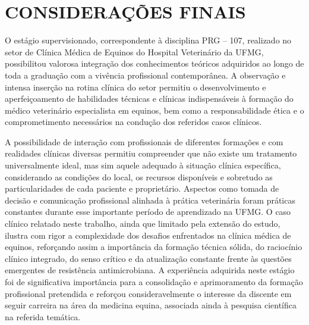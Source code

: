 \chapter{CONSIDERAÇÕES FINAIS}
\label{cap:conclusao}

O estágio supervisionado, correspondente à disciplina PRG -- 107,
realizado no setor de Clínica Médica de Equinos do Hospital Veterinário
da UFMG, possibilitou valorosa integração dos conhecimentos teóricos
adquiridos ao longo de toda a graduação com a vivência profissional
contemporânea. A observação e intensa inserção na rotina clínica do
setor permitiu o desenvolvimento e aperfeiçoamento de habilidades
técnicas e clínicas indispensáveis à formação do médico veterinário
especialista em equinos, bem como a responsabilidade ética e o
comprometimento necessários na condução dos referidos casos clínicos.

A possibilidade de interação com profissionais de diferentes formações e
com realidades clínicas diversas permitiu compreender que não existe um
tratamento universalmente ideal, mas sim aquele adequado à situação
clínica específica, considerando as condições do local, os recursos
disponíveis e sobretudo as particularidades de cada paciente e
proprietário. Aspectos como tomada de decisão e comunicação profissional
alinhada à prática veterinária foram práticas constantes durante esse
importante período de aprendizado na UFMG. O caso clínico relatado neste
trabalho, ainda que limitado pela extensão do estudo, ilustra com rigor
a complexidade dos desafios enfrentados na clínica médica de equinos,
reforçando assim a importância da formação técnica sólida, do raciocínio
clínico integrado, do senso crítico e da atualização constante frente às
questões emergentes de resistência antimicrobiana. A experiência
adquirida neste estágio foi de significativa importância para a
consolidação e aprimoramento da formação profissional pretendida e
reforçou consideravelmente o interesse da discente em seguir carreira na
área da medicina equina, associada ainda à pesquisa científica na
referida temática.
